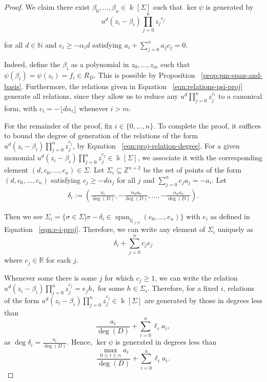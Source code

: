 \documentclass{amsart}
\theoremstyle{plain}
\theoremstyle{definition}
\theoremstyle{remark}
\numberwithin{equation}{section}
\newcommand\bq{{\mathbb Q}}
\newcommand\bz{{\mathbb Z}}
\newcommand\bk{{\Bbbk}}
\newcommand\bida{a}
\DeclareMathOperator{\newspan}{span}
\begin{document}
\begin{proof}
We claim there exist $\beta_0, \ldots, \beta_n \in \bk[\Sigma]$
such that $\ker \psi$ is generated by
\begin{equation}
\label{eqn:relations-psi-proj}
	u^d(z_i - \beta_i)\prod_{j=0}^n {z_j}^{c_{j}}
\end{equation}

\noindent
for all $d \in \mathbb{N}$ and $c_i \ge -\alpha_i d$ satisfying
$\bida_i + \sum_{j = 0}^n \bida_j c_j = 0$.

Indeed, define the $\beta_i$ as a polynomial in $z_0, \ldots, z_m$ such that $\psi(\beta_i) = \psi(z_i) = f_i \in R_D.$ This is possible by Proposition ~\ref{prop:pm-span-and-basis}.
Furthermore, the relations given in Equation
~\eqref{eqn:relations-psi-proj} generate all relations, since they
allow us to reduce any $u^d \prod_{j = 0}^n z_j^{c_i}$ to a canonical
form, with $c_i = -\lfloor  d \alpha_i\rfloor$ whenever $i  > m$.

For the remainder of the proof, fix $i \in \{0,\ldots, n\}$. To
complete the proof, it suffices to bound the degree of generation
of the relations of the form $u^d(z_i - \beta_i) \prod_{j = 0}^n
z_j^{c_j}$, by Equation ~\eqref{eqn:proj-relation-degree}. For
a given monomial
$u^d(z_i - \beta_i)\prod_{j=0}^n z_j^{c_j} \in \bk[\Sigma]$, we associate it with the corresponding element $(d, c_0,\ldots, c_n) \in\Sigma$. Let $\Sigma_i \subseteq \bz^{n + 2}$
be the set of points of the form $(d, c_0, \ldots, c_n)$ satisfying
$c_j \ge -d \alpha_j$ for all $j$ and $\sum_{j=0}^n c_j a_j = -a_i$.
Let
\begin{align*}
	\delta_i := \left(\frac{a_i}{\deg(D)}, -\frac{\alpha_0 a_0}{\deg(D)},
	\ldots, - \frac{\alpha_n a_n}{\deg(D)} \right).
\end{align*}

\noindent
Then we see $\Sigma_i = \{\sigma \in \Sigma | \sigma - \delta_i \in \newspan_{\bq_{\geq 0}}
(e_0, \ldots, e_n)\}$ with $e_i$ as defined in Equation
~\ref{eqn:e-i-proj}. Therefore, we can write any element of
$\Sigma_i$ uniquely as
\[
	\delta_i + \sum_{j=0}^n c_j e_j
\]
where $c_j \in \mathbb{R}$ for each $j$.

Whenever some there is some $j$ for which $c_j \ge 1$, we can write the relation $u^d(z_i -
\beta_i)\prod_{j=0}^n z_j^{c_j} = e_j h,$ for some
$h \in \Sigma_i$. Therefore, for a fixed $i$, relations of the form
$u^d(z_i - \beta_i)\prod_{j=0}^n z_j^{c_j} \in \bk[\Sigma]$ are
generated by those in degrees less than
\[
	\frac{\bida_i}{\deg(D)} + \sum_{i=0}^n \ell_i a_i,
\]
as $\deg \delta_i = \frac{a_i}{\deg(D)}$. Hence,
$\ker \psi$ is generated in degrees less than
\[
	\frac{\max_{0 \leq i \leq n} \bida_i}{\deg(D)} + \sum_{i=0}^n \ell_i a_i.
\]
\end{proof}
\end{document}
